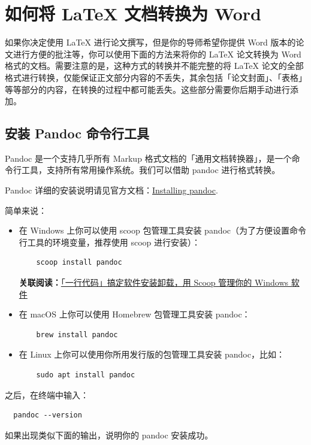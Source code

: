 \section{如何将 {\LaTeX} 文档转换为 Word}

如果你决定使用 LaTeX 进行论文撰写，但是你的导师希望你提供 Word 版本的论文进行方便的批注等，你可以使用下面的方法来将你的 LaTeX 论文转换为 Word 格式的文档。需要注意的是，这种方式的转换并不能完整的将 LaTeX 论文的全部格式进行转换，仅能保证正文部分内容的不丢失，其余包括「论文封面」、「表格」等等部分的内容，在转换的过程中都可能丢失。这些部分需要你后期手动进行添加。

\subsection{安装 Pandoc 命令行工具}

Pandoc 是一个支持几乎所有 Markup 格式文档的「通用文档转换器」，是一个命令行工具，支持所有常用操作系统。我们可以借助 pandoc 进行格式转换。

Pandoc 详细的安装说明请见官方文档：\href{https://pandoc.org/installing.html}{Installing pandoc}.

简单来说：

\begin{itemize}
  \item 在 Windows 上你可以使用 scoop 包管理工具安装 pandoc（为了方便设置命令行工具的环境变量，推荐使用 scoop 进行安装）：
  \begin{verbatim}
    scoop install pandoc
  \end{verbatim}
  \textbf{关联阅读：}\href{https://sspai.com/post/52496}{「一行代码」搞定软件安装卸载，用 Scoop 管理你的 Windows 软件}
  \item 在 macOS 上你可以使用 Homebrew 包管理工具安装 pandoc：
  \begin{verbatim}
    brew install pandoc 
  \end{verbatim}
  \item 在 Linux 上你可以使用你所用发行版的包管理工具安装 pandoc，比如：
  \begin{verbatim}
    sudo apt install pandoc 
  \end{verbatim}
\end{itemize}

之后，在终端中输入：
\begin{verbatim}
  pandoc --version 
\end{verbatim}

如果出现类似下面的输出，说明你的 pandoc 安装成功。

